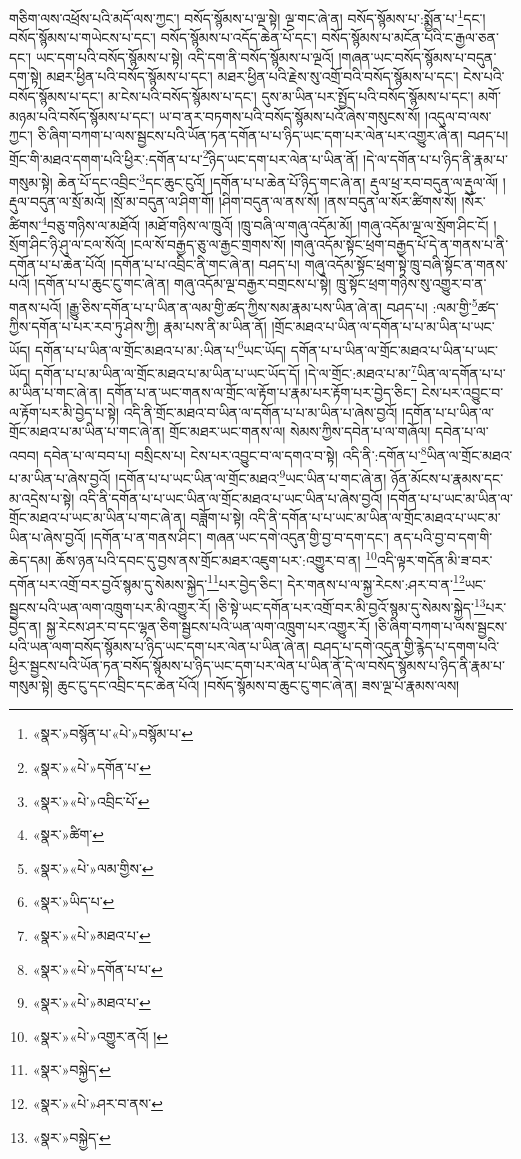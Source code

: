 གཅིག་ལས་འཕྲོས་པའི་མདོ་ལས་ཀྱང་། བསོད་སྙོམས་པ་ལྔ་སྟེ། ལྔ་གང་ཞེ་ན། བསོད་སྙོམས་པ་:སྨྱོན་པ་\footnote{«སྣར་»བསྙོན་པ་«པེ་»བསྙོམ་པ་}དང་། བསོད་སྙོམས་པ་གཡེངས་པ་དང་། བསོད་སྙོམས་པ་འདོད་ཆེན་པོ་དང་། བསོད་སྙོམས་པ་མངོན་པའི་ང་རྒྱལ་ཅན་དང་། ཡང་དག་པའི་བསོད་སྙོམས་པ་སྟེ། འདི་དག་ནི་བསོད་སྙོམས་པ་ལྔའོ། །གཞན་ཡང་བསོད་སྙོམས་པ་བདུན་དག་སྟེ། མཐར་ཕྱིན་པའི་བསོད་སྙོམས་པ་དང་། མཐར་ཕྱིན་པའི་རྗེས་སུ་འགྲོ་བའི་བསོད་སྙོམས་པ་དང་། ངེས་པའི་བསོད་སྙོམས་པ་དང་། མ་ངེས་པའི་བསོད་སྙོམས་པ་དང་། དུས་མ་ཡིན་པར་སྤྱོད་པའི་བསོད་སྙོམས་པ་དང་། མགོ་མཉམ་པའི་བསོད་སྙོམས་པ་དང་། ཡ་བ་ནར་བཏགས་པའི་བསོད་སྙོམས་པའོ་ཞེས་གསུངས་སོ། །འདུལ་བ་ལས་ཀྱང་། ཅི་ཞིག་བཀག་པ་ལས་སྦྱངས་པའི་ཡོན་ཏན་དགོན་པ་པ་ཉིད་ཡང་དག་པར་ལེན་པར་འགྱུར་ཞེ་ན། བཤད་པ། གྲོང་གི་མཐའ་དགག་པའི་ཕྱིར་:དགོན་པ་པ་\footnote{«སྣར་»«པེ་»དགོན་པ་}ཉིད་ཡང་དག་པར་ལེན་པ་ཡིན་ནོ། །དེ་ལ་དགོན་པ་པ་ཉིད་ནི་རྣམ་པ་གསུམ་སྟེ། ཆེན་པོ་དང་འབྲིང་\footnote{«སྣར་»«པེ་»འབྲིང་པོ་}དང་ཆུང་ངུའོ། །དགོན་པ་པ་ཆེན་པོ་ཉིད་གང་ཞེ་ན། རྡུལ་ཕྲ་རབ་བདུན་ལ་རྡུལ་ལོ། །རྡུལ་བདུན་ལ་སྲོ་མའོ། །སྲོ་མ་བདུན་ལ་ཤིག་གོ། །ཤིག་བདུན་ལ་ནས་སོ། །ནས་བདུན་ལ་སོར་ཚིགས་སོ། །སོར་ཚིགས་\footnote{«སྣར་»ཚིག་}བཅུ་གཉིས་ལ་མཐོའོ། །མཐོ་གཉིས་ལ་ཁྲུའོ། །ཁྲུ་བཞི་ལ་གཞུ་འདོམ་མོ། །གཞུ་འདོམ་ལྔ་ལ་སྲོག་ཤིང་ངོ། །སྲོག་ཤིང་ཉི་ཤུ་ལ་ངལ་སོའོ། །ངལ་སོ་བརྒྱད་ཅུ་ལ་རྒྱང་གྲགས་སོ། །གཞུ་འདོམ་སྟོང་ཕྲག་བརྒྱད་པོ་དེ་ན་གནས་པ་ནི་དགོན་པ་པ་ཆེན་པོའོ། །དགོན་པ་པ་འབྲིང་ནི་གང་ཞེ་ན། བཤད་པ། གཞུ་འདོམ་སྟོང་ཕྲག་སྟེ་ཁྲུ་བཞི་སྟོང་ན་གནས་པའོ། །དགོན་པ་པ་ཆུང་ངུ་གང་ཞེ་ན། གཞུ་འདོམ་ལྔ་བརྒྱར་བགྲངས་པ་སྟེ། ཁྲུ་སྟོང་ཕྲག་གཉིས་སུ་འགྱུར་བ་ན་གནས་པའོ། །རྒྱུ་ཅིས་དགོན་པ་པ་ཡིན་ན་ལམ་གྱི་ཚད་ཀྱིས་སམ་རྣམ་པས་ཡིན་ཞེ་ན། བཤད་པ། :ལམ་གྱི་\footnote{«སྣར་»«པེ་»ལམ་གྱིས་}ཚད་ཀྱིས་དགོན་པ་པར་རབ་ཏུ་ཤེས་ཀྱི། རྣམ་པས་ནི་མ་ཡིན་ནོ། །གྲོང་མཐའ་པ་ཡིན་ལ་དགོན་པ་པ་མ་ཡིན་པ་ཡང་ཡོད། དགོན་པ་པ་ཡིན་ལ་གྲོང་མཐའ་པ་མ་:ཡིན་པ་\footnote{«སྣར་»ཡིད་པ་}ཡང་ཡོད། དགོན་པ་པ་ཡིན་ལ་གྲོང་མཐའ་པ་ཡིན་པ་ཡང་ཡོད། དགོན་པ་པ་མ་ཡིན་ལ་གྲོང་མཐའ་པ་མ་ཡིན་པ་ཡང་ཡོད་དོ། །དེ་ལ་གྲོང་:མཐའ་པ་མ་\footnote{«སྣར་»«པེ་»མཐའ་པ་}ཡིན་ལ་དགོན་པ་པ་མ་ཡིན་པ་གང་ཞེ་ན། དགོན་པ་ན་ཡང་གནས་ལ་གྲོང་ལ་རྟོག་པ་རྣམ་པར་རྟོག་པར་བྱེད་ཅིང་། ངེས་པར་འབྱུང་བ་ལ་རྟོག་པར་མི་བྱེད་པ་སྟེ། འདི་ནི་གྲོང་མཐའ་བ་ཡིན་ལ་དགོན་པ་པ་མ་ཡིན་པ་ཞེས་བྱའོ། །དགོན་པ་པ་ཡིན་ལ་གྲོང་མཐའ་པ་མ་ཡིན་པ་གང་ཞེ་ན། གྲོང་མཐར་ཡང་གནས་ལ། སེམས་ཀྱིས་དབེན་པ་ལ་གཞོལ། དབེན་པ་ལ་འབབ། དབེན་པ་ལ་བབ་པ། བསྲིངས་པ། ངེས་པར་འབྱུང་བ་ལ་དགའ་བ་སྟེ། འདི་ནི་:དགོན་པ་\footnote{«སྣར་»«པེ་»དགོན་པ་པ་}ཡིན་ལ་གྲོང་མཐའ་པ་མ་ཡིན་པ་ཞེས་བྱའོ། །དགོན་པ་པ་ཡང་ཡིན་ལ་གྲོང་མཐའ་\footnote{«སྣར་»«པེ་»མཐའ་པ་}ཡང་ཡིན་པ་གང་ཞེ་ན། ཉོན་མོངས་པ་རྣམས་དང་མ་འདྲེས་པ་སྟེ། འདི་ནི་དགོན་པ་པ་ཡང་ཡིན་ལ་གྲོང་མཐའ་པ་ཡང་ཡིན་པ་ཞེས་བྱའོ། །དགོན་པ་པ་ཡང་མ་ཡིན་ལ་གྲོང་མཐའ་པ་ཡང་མ་ཡིན་པ་གང་ཞེ་ན། བཟློག་པ་སྟེ། འདི་ནི་དགོན་པ་པ་ཡང་མ་ཡིན་ལ་གྲོང་མཐའ་པ་ཡང་མ་ཡིན་པ་ཞེས་བྱའོ། །དགོན་པ་ན་གནས་ཤིང་། གཞན་ཡང་དགེ་འདུན་གྱི་བྱ་བ་དག་དང་། ནད་པའི་བྱ་བ་དག་གི་ཆེད་དམ། ཆོས་ཉན་པའི་དབང་དུ་བྱས་ནས་གྲོང་མཐར་འཇུག་པར་:འགྱུར་བ་ན། \footnote{«སྣར་»«པེ་»འགྱུར་ནའོ། ། }འདི་ལྟར་གདོན་མི་ཟ་བར་དགོན་པར་འགྲོ་བར་བྱའོ་སྙམ་དུ་སེམས་སྐྱེད་\footnote{«སྣར་»བསྐྱེད་}པར་བྱེད་ཅིང་། དེར་གནས་པ་ལ་སྐྱ་རེངས་:ཤར་བ་ན་\footnote{«སྣར་»«པེ་»ཤར་བ་ནས་}ཡང་སྦྱངས་པའི་ཡན་ལག་འཁྲུག་པར་མི་འགྱུར་རོ། །ཅི་སྟེ་ཡང་དགོན་པར་འགྲོ་བར་མི་བྱའོ་སྙམ་དུ་སེམས་སྐྱེད་\footnote{«སྣར་»བསྐྱེད་}པར་བྱེད་ན། སྐྱ་རེངས་ཤར་བ་དང་ལྷན་ཅིག་སྦྱངས་པའི་ཡན་ལག་འཁྲུག་པར་འགྱུར་རོ། །ཅི་ཞིག་བཀག་པ་ལས་སྦྱངས་པའི་ཡན་ལག་བསོད་སྙོམས་པ་ཉིད་ཡང་དག་པར་ལེན་པ་ཡིན་ཞེ་ན། བཤད་པ་དགེ་འདུན་གྱི་རྙེད་པ་དགག་པའི་ཕྱིར་སྦྱངས་པའི་ཡོན་ཏན་བསོད་སྙོམས་པ་ཉིད་ཡང་དག་པར་ལེན་པ་ཡིན་ནོ་དེ་ལ་བསོད་སྙོམས་པ་ཉིད་ནི་རྣམ་པ་གསུམ་སྟེ། ཆུང་ངུ་དང་འབྲིང་དང་ཆེན་པོའོ། །བསོད་སྙོམས་བ་ཆུང་ངུ་གང་ཞེ་ན། ཟས་ལྔ་པོ་རྣམས་ལས། 